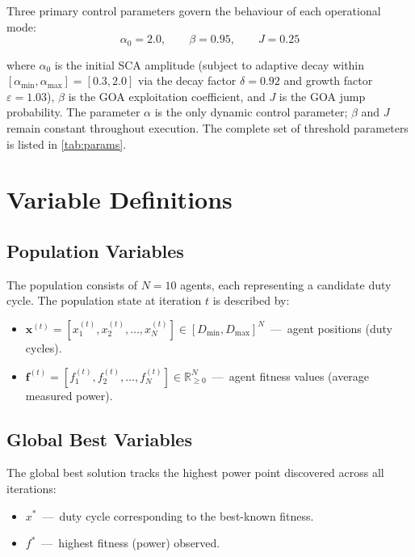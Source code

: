 \documentclass[a4paper, 12pt]{article}
\begin{document}
Three primary control parameters govern the behaviour of each operational mode:
\begin{equation}
    \alpha_0 = 2.0, \qquad \beta = 0.95, \qquad J = 0.25
    \label{eq:control_params}
\end{equation}

where $\alpha_0$ is the initial SCA amplitude (subject to adaptive decay within $[\alpha_{\min}, \alpha_{\max}] = [0.3, 2.0]$ via the decay factor $\delta = 0.92$ and growth factor $\varepsilon = 1.03$), $\beta$ is the GOA exploitation coefficient, and $J$ is the GOA jump probability. The parameter $\alpha$ is the only dynamic control parameter; $\beta$ and $J$ remain constant throughout execution. The complete set of threshold parameters is listed in \cref{tab:params}.


\section{Variable Definitions}
\label{sec:variables}

\subsection{Population Variables}

The population consists of $N = 10$ agents, each representing a candidate duty cycle. The population state at iteration $t$ is described by:
\begin{itemize}[leftmargin=2cm]
    \item $\mathbf{x}^{(t)} = [x_1^{(t)}, x_2^{(t)}, \ldots, x_N^{(t)}] \in [D_{\min}, D_{\max}]^N$ \,---\, agent positions (duty cycles).
    \item $\mathbf{f}^{(t)} = [f_1^{(t)}, f_2^{(t)}, \ldots, f_N^{(t)}] \in \mathbb{R}_{\geq 0}^N$ \,---\, agent fitness values (average measured power).
\end{itemize}

\subsection{Global Best Variables}

The global best solution tracks the highest power point discovered across all iterations:
\begin{itemize}[leftmargin=2cm]
    \item $x^{*}$ \,---\, duty cycle corresponding to the best-known fitness.
    \item $f^{*}$ \,---\, highest fitness (power) observed.
\end{itemize}
\end{document}
